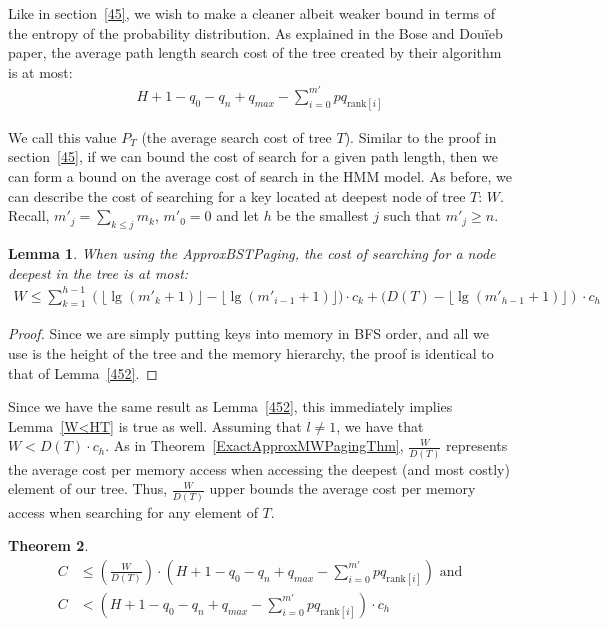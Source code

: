 \documentclass[letterpaper,12pt,titlepage,oneside,final]{book}
\theoremstyle{plain}
\newtheorem{thm}{Theorem}[section]
\newtheorem{lem}[thm]{Lemma}
\begin{document}
Like in section~\ref{45}, we wish to make a cleaner albeit weaker bound in terms of the entropy of the probability distribution. As explained in the Bose and Dou\"{i}eb paper, the average path length search cost of the tree created by their algorithm is at most: \cite{bose2009efficient}
\begin{align*}
H + 1 - q_0 - q_n + q_{max} - \sum_{i=0}^{m'} pq_{\text{rank}[i]}
\end{align*}

We call this value $P_T$ (the average search cost of tree $T$). Similar to the proof in section~\ref{45}, if we can bound the cost of search for a given path length, then we can form a bound on the average cost of search in the HMM model. As before, we can describe the cost of searching for a key located at deepest node of tree $T$: $W$. Recall, $m'_j = \sum_{k \leq j} m_k$, $m'_0 = 0$ and let $h$ be the smallest $j$ such that $m'_j \geq n$.

\begin{lem} 
When using the ApproxBSTPaging, the cost of searching for a node deepest in the tree is at most:
\begin{align*}
W \leq \sum_{k=1}^{h-1} \left(\lfloor \lg(m'_k+1) \rfloor - \lfloor \lg(m'_{i-1}+1) \rfloor)\cdot c_k+ (D(T) - \lfloor \lg(m'_{h-1}+1) \rfloor \right)\cdot c_h
\end{align*}
\end{lem}

\begin{proof}
Since we are simply putting keys into memory in BFS order, and all we use is the height of the tree and the memory hierarchy, the proof is identical to that of Lemma~\ref{452}.
\end{proof}

Since we have the same result as Lemma~\ref{452}, this immediately implies Lemma~\ref{W<HT} is true as well. Assuming that $l \neq 1$, we have that $W<D(T)\cdot c_h$. As in Theorem~\ref{ExactApproxMWPagingThm}, $\frac{W}{D(T)}$ represents the average cost per memory access when accessing the deepest (and most costly) element of our tree. Thus, $\frac{W}{D(T)}$ upper bounds the average cost per memory access when searching for any element of $T$.
\\

\begin{thm} \label{ApproxBSTThm}
\begin{align*}
C &\leq  (\frac{W}{D(T)}) \cdot  (H + 1 - q_0 - q_n + q_{max} - \sum_{i=0}^{m'} pq_{\text{rank}[i]}) \text{ and} \\
C &<  (H + 1 - q_0 - q_n + q_{max} - \sum_{i=0}^{m'} pq_{\text{rank}[i]})\cdot c_h
\end{align*}
\end{thm}
\end{document}
